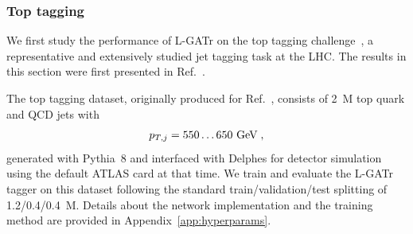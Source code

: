 \documentclass[submission, Phys]{SciPost}
\begin{document}
\subsubsection*{Top tagging}


We first study the performance of L-GATr on the top tagging challenge~\cite{Kasieczka:2019dbj}, a representative and extensively studied jet tagging task at the LHC. The results in this section were first presented in Ref.~\cite{Spinner:2024hjm}.

The top tagging dataset, originally produced for Ref.~\cite{Heimel:2018mkt}, consists of 2~M top quark and QCD jets with 
%
\begin{align}
  p_{T,j} = 550 \ldots 650~\text{GeV} \; ,
\end{align}
%
generated with Pythia~8 and interfaced with Delphes for detector simulation using the default ATLAS card at that time.
We train and evaluate the L-GATr tagger on this dataset following the standard train/validation/test splitting of 1.2/0.4/0.4~M. Details about the network implementation and the training method are provided in Appendix~\ref{app:hyperparams}. 
\end{document}
